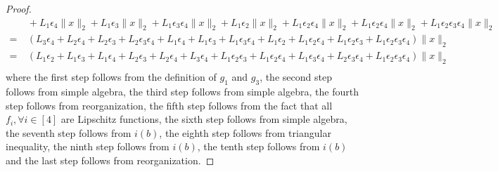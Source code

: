 \begin{proof}
\begin{align*}
        &~ + L_1 \epsilon_4 \| x\|_2  + L_1 \epsilon_3 \|x\|_2 +L_1 \epsilon_3 \epsilon_4 \| x \|_2 + L_1 \epsilon_2 \|x\|_2 + L_1 \epsilon_2 \epsilon_4 \| x\|_2  + L_1 \epsilon_2 \epsilon_4 \|x\|_2 +  L_1 \epsilon_2 \epsilon_3 \epsilon_4\|x \|_2    \\
        =  &~  (L_3  \epsilon_4  + L_2  \epsilon_4  + L_2 \epsilon_3  +L_2 \epsilon_3 \epsilon_4  + L_1 \epsilon_4   + L_1 \epsilon_3  +L_1 \epsilon_3 \epsilon_4 + L_1 \epsilon_2  + L_1 \epsilon_2 \epsilon_4   + L_1 \epsilon_2 \epsilon_3  +  L_1 \epsilon_2 \epsilon_3 \epsilon_4)  \|x \|_2   \\
        =  &~  (L_1 \epsilon_2  + L_1 \epsilon_3  +L_1 \epsilon_4   +
        L_2 \epsilon_3  + L_2  \epsilon_4  + L_3  \epsilon_4  +
        L_1 \epsilon_2 \epsilon_3  +L_1 \epsilon_2 \epsilon_4   +L_1 \epsilon_3 \epsilon_4 +
        L_2 \epsilon_3 \epsilon_4  +
        L_1 \epsilon_2 \epsilon_3 \epsilon_4)  \|x \|_2   \\
    \end{align*}
where the first step follows from the definition of $g_1$ and $g_3$, 
the second step follows from simple algebra, 
the third step follows from simple algebra, 
the fourth step follows from reorganization, 
the fifth step follows from the fact that all $f_i, \forall i \in [4]$ are Lipschitz functions,
the sixth step follows from simple algebra, 
the seventh step follows from $i(b)$,
the eighth step follows from triangular inequality,
the ninth step follows from $i(b)$,
the tenth step follows from $i(b)$
and the last step follows from reorganization. 


\end{proof}

